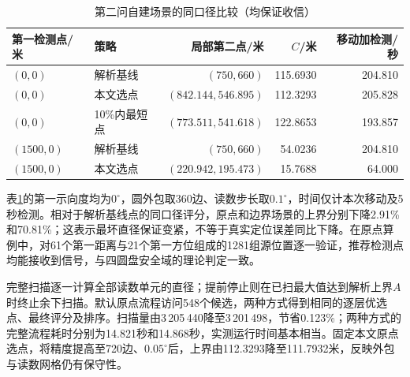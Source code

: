 \begin{table}[htbp]
 \centering
 \caption{第二问自建场景的同口径比较（均保证收信）}
 \label{tab:p2_selection}
 \begin{tabular}{llrrr}
 \hline
 第一检测点/米 & 策略 & 局部第二点/米 & $C$/米 & 移动加检测/秒\\
 \hline
 $(0,0)$ & 解析基线 & $(750,660)$ & 115.6930 & 204.810\\
 $(0,0)$ & 本文选点 & $(842.144,546.895)$ & 112.3293 & 205.828\\
 $(0,0)$ & 10\%内最短点 & $(773.511,541.618)$ & 122.8653 & 193.857\\
 $(1500,0)$ & 解析基线 & $(750,660)$ & 54.0236 & 204.810\\
 $(1500,0)$ & 本文选点 & $(220.942,195.473)$ & 15.7688 & 64.000\\
 \hline
 \end{tabular}
\end{table}
表\ref{tab:p2_selection}的第一示向度均为$0^\circ$，圆外包取360边、读数步长取$0.1^\circ$，时间仅计本次移动及5秒检测。相对于解析基线点的同口径评分，原点和边界场景的上界分别下降2.91\%和70.81\%；这表示最坏直径保证变紧，不等于真实定位误差同比下降。在原点算例中，对61个第一距离与21个第一方位组成的1281组源位置逐一验证，推荐检测点均能接收到信号，与四圆盘安全域的理论判定一致。

完整扫描逐一计算全部读数单元的直径；提前停止则在已扫最大值达到解析上界$A$时终止余下扫描。默认原点流程访问548个候选，两种方式得到相同的逐层优选点、最终评分及排序。扫描量由3\,205\,440降至3\,201\,498，节省0.123\%；两种方式的完整流程耗时分别为14.821秒和14.868秒，实测运行时间基本相当。固定本文原点选点，将精度提高至720边、$0.05^\circ$后，上界由112.3293降至111.7932米，反映外包与读数网格仍有保守性。
